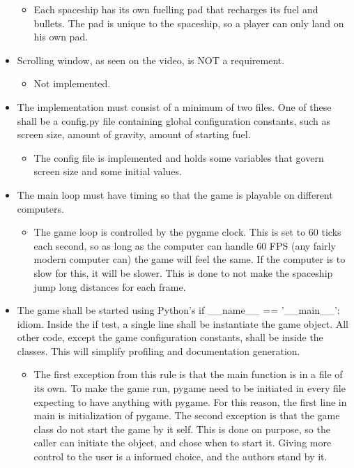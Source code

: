 \documentclass{article}
\begin{document}
\begin{itemize}
	\begin{itemize}
		\item Each spaceship has its own fuelling pad that recharges its fuel and bullets. The pad is unique to the spaceship, so a player can only land on his own pad.
	\end{itemize}
	\item Scrolling window, as seen on the video, is NOT a requirement.
	\begin{itemize}
		\item Not implemented.
	\end{itemize}
	\item The implementation must consist of a minimum of two files. One of these shall be a config.py file containing global configuration constants, such as screen size, amount of gravity, amount of starting fuel.
	\begin{itemize}
		\item The config file is implemented and holds some variables that govern screen size and some initial values.
	\end{itemize}
	\item The main loop must have timing so that the game is playable on different computers.
	\begin{itemize}
		\item The game loop is controlled by the pygame clock. This is set to 60 ticks each second, so as long as the computer can handle 60 FPS (any fairly modern computer can) the game will feel the same. If the computer is to slow for this, it will be slower. This is done to not make the spaceship jump long distances for each frame.
	\end{itemize}
	\item The game shall be started using Python's if \_\_name\_\_ == '\_\_main\_\_': idiom. Inside the if test, a single line shall be instantiate the game object. All other code, except the game configuration constants, shall be inside the classes. This will simplify profiling and documentation generation.
	\begin{itemize}
		\item The first exception from this rule is that the main function is in a file of its own. To make the game run, pygame need to be initiated in every file expecting to have anything with pygame. For this reason, the first line in main is initialization of pygame. The second exception is that the game class do not start the game by it self. This is done on purpose, so the caller can initiate the object, and chose when to start it. Giving more control to the user is a informed choice, and the authors stand by it.

\end{itemize}
\end{itemize}
\end{document}
